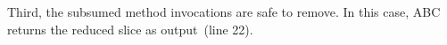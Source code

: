 \documentclass[10pt,conference]{IEEEtran}
\makeatletter
\gdef\xxx{\@ifnextchar[\xxx@lab\xxx@nolab}
\newcommand{\abc}{\textsf{ABC}\xspace}
\makeatother
\begin{document}
Third, the subsumed method invocations are safe to remove. In this case, \abc returns the reduced slice as output~(line 22).


\end{document}
